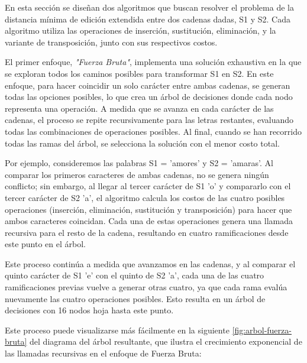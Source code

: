En esta sección se diseñan dos algoritmos que buscan resolver el problema de la distancia mínima de edición extendida entre dos cadenas dadas, S1 y S2. Cada algoritmo utiliza las operaciones de inserción, sustitución, eliminación, y la variante de transposición, junto con sus respectivos costos.

El primer enfoque, \textit{"Fuerza Bruta"}, implementa una solución exhaustiva en la que se exploran todos los caminos posibles para transformar S1 en S2. En este enfoque, para hacer coincidir un solo carácter entre ambas cadenas, se generan todas las opciones posibles, lo que crea un árbol de decisiones donde cada nodo representa una operación. A medida que se avanza en cada carácter de las cadenas, el proceso se repite recursivamente para las letras restantes, evaluando todas las combinaciones de operaciones posibles. Al final, cuando se han recorrido todas las ramas del árbol, se selecciona la solución con el menor costo total.

Por ejemplo, consideremos las palabras S1 = 'amores' y S2 = 'amaras'. Al comparar los primeros caracteres de ambas cadenas, no se genera ningún conflicto; sin embargo, al llegar al tercer carácter de S1 'o' y compararlo con el tercer carácter de S2 'a', el algoritmo calcula los costos de las cuatro posibles operaciones (inserción, eliminación, sustitución y transposición) para hacer que ambos caracteres coincidan. Cada una de estas operaciones genera una llamada recursiva para el resto de la cadena, resultando en cuatro ramificaciones desde este punto en el árbol.

Este proceso continúa a medida que avanzamos en las cadenas, y al comparar el quinto carácter de S1 'e' con el quinto de S2 'a', cada una de las cuatro ramificaciones previas vuelve a generar otras cuatro, ya que cada rama evalúa nuevamente las cuatro operaciones posibles. Esto resulta en un árbol de decisiones con 16 nodos hoja hasta este punto.

Este proceso puede visualizarse más fácilmente en la siguiente \cref{fig:arbol-fuerza-bruta} del diagrama del árbol resultante, que ilustra el crecimiento exponencial de las llamadas recursivas en el enfoque de Fuerza Bruta:


